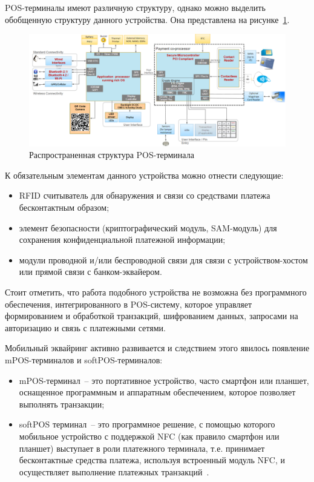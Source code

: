 POS-терминалы имеют различную структуру, однако можно выделить обобщенную структуру данного устройства.
Она представлена на рисунке~\ref{fig:postrem_struct}.

\begin{figure}[H]
    \centering
    \includegraphics[width=1\textwidth]{images/research/postrem_struct}
    \caption{\centering Распространенная структура POS-терминала}
    \label{fig:postrem_struct}
\end{figure}

К обязательным элементам данного устройства можно отнести следующие:

\begin{itemize}
    \item RFID считыватель для обнаружения и связи со средствами платежа бесконтактным образом;
    \item элемент безопасности (криптографический модуль, SAM-модуль) для сохранения конфиденциальной платежной информации;
    \item модули проводной и/или беспроводной связи для связи с устройством-хостом или прямой связи с банком-эквайером.
\end{itemize}

Стоит отметить, что работа подобного устройства не возможна без программного обеспечения, интегрированного в POS-систему, которое управляет формированием и обработкой транзакций, шифрованием данных, запросами на авторизацию и связь с платежными сетями.

Мобильный эквайринг активно развивается и следствием этого явилось появление mPOS-терминалов и softPOS-терминалов:

\begin{itemize}
    \item mPOS-терминал~-- это портативное устройство, часто смартфон или планшет, оснащенное программным и аппаратным обеспечением, которое позволяет выполнять транзакции;
    \item softPOS терминал~-- это программное решение, с помощью которого мобильное устройство с поддержкой NFC (как правило смартфон или планшет) выступает в роли платежного терминала, т.е. принимает бесконтактные средства платежа, используя встроенный модуль NFC, и осуществляет выполнение платежных транзакций~\cite{pos_term}.
\end{itemize}

